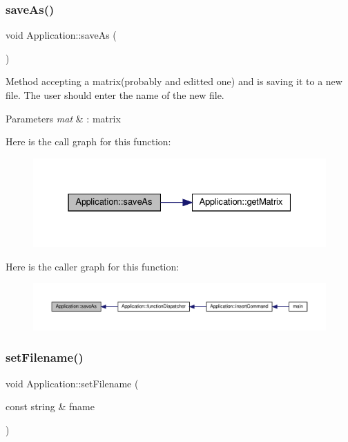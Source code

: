 \subsubsection{\texorpdfstring{save\+As()}{saveAs()}}
{\footnotesize\ttfamily void Application\+::save\+As (\begin{DoxyParamCaption}{ }\end{DoxyParamCaption})\hspace{0.3cm}{\ttfamily [private]}}

Method accepting a matrix(probably and editted one) and is saving it to a new file. The user should enter the name of the new file. 
\begin{DoxyParams}{Parameters}
{\em mat} & \+: matrix \\
\hline
\end{DoxyParams}
Here is the call graph for this function\+:
\nopagebreak
\begin{figure}[H]
\begin{center}
\leavevmode
\includegraphics[width=331pt]{class_application_a10d5a48c95593cee25c1b9e0e257b5a7_cgraph}
\end{center}
\end{figure}
Here is the caller graph for this function\+:
\nopagebreak
\begin{figure}[H]
\begin{center}
\leavevmode
\includegraphics[width=350pt]{class_application_a10d5a48c95593cee25c1b9e0e257b5a7_icgraph}
\end{center}
\end{figure}
\mbox{\label{class_application_a76de879568ee39ac80484441716928d2}} 
\subsubsection{\texorpdfstring{set\+Filename()}{setFilename()}}
{\footnotesize\ttfamily void Application\+::set\+Filename (\begin{DoxyParamCaption}\item[{const string \&}]{fname }\end{DoxyParamCaption})}

